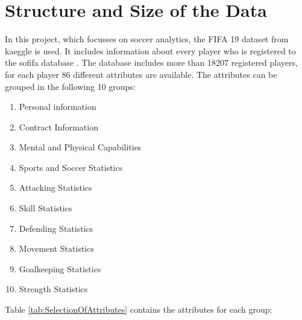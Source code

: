 \documentclass[runningheads]{llncs}
\begin{document}
\section{Structure and Size of the Data}
In this project, which focusses on soccer analytics, the FIFA 19 dataset from kaeggle is used. It includes information about every player who is registered to the sofifa database \cite{ref_sofifa}. 
The database includes more than 18207 registered players, for each player 86 different attributes are available. The attributes can be grouped in the following 10 groups: 
\begin{multicols}{2}
	\begin{enumerate}
	\item Personal information
	\item Contract Information
	\item Mental and Physical Capabilities
	\item Sports and Soccer Statistics
	\item Attacking Statistics  
	\item Skill Statistics
	\item Defending Statistics
	\item Movement Statistics
	\item Goalkeeping Statistics
	\item Strength Statistics
\end{enumerate}
\end{multicols}

Table \ref{tab:SelectionOfAttributes} contains the attributes for each group:
\end{document}
